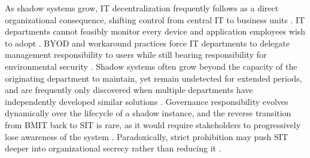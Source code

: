 \documentclass[12pt,oneside]{article}
\begin{document}
As shadow systems grow, \ac{IT} decentralization frequently follows as a direct organizational consequence, shifting control from central \ac{IT} to business units \citep[6]{furstenau2016shadow}. \ac{IT} departments cannot feasibly monitor every device and application employees wish to adopt \citep[3]{koch2014consumerization}. \ac{BYOD} and workaround practices force \ac{IT} departments to delegate management responsibility to users while still bearing responsibility for environmental security \citep[2]{dulipovici2016byod}. Shadow systems often grow beyond the capacity of the originating department to maintain, yet remain undetected for extended periods, and are frequently only discovered when multiple departments have independently developed similar solutions \citep[9-10]{koch2014consumerization}. Governance responsibility evolves dynamically over the lifecycle of a shadow instance, and the reverse transition from \ac{BMIT} back to \ac{SIT} is rare, as it would require stakeholders to progressively lose awareness of the system \citep[10, 12]{klotz2020shadow}. Paradoxically, strict prohibition may push \ac{SIT} deeper into organizational secrecy rather than reducing it \citep[472]{haag2017shadow}.
\end{document}

